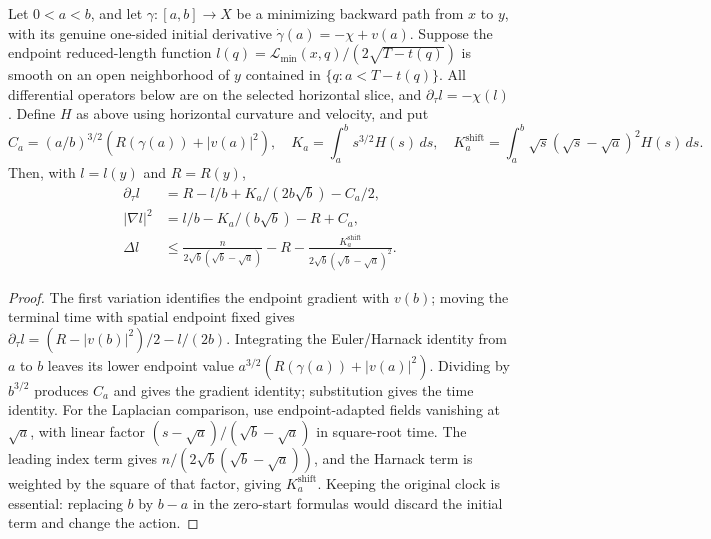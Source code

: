\begin{proposition}
\label{prop:positive-start}
Let $0<a<b$, and let $\gamma:[a,b]\to X$ be a minimizing backward
path from $x$ to $y$, with its genuine one-sided initial derivative
$\dot\gamma(a)=-\chi+v(a)$.  Suppose the endpoint reduced-length function
$l(q)=\mathcal L_{\min}(x,q)/(2\sqrt{T-t(q)})$ is smooth on an open
neighborhood of $y$ contained in $\{q:a<T-t(q)\}$.  All differential
operators below are on the selected horizontal slice, and
$\partial_\tau l=-\chi(l)$.  Define $H$ as above using horizontal
curvature and velocity, and put
\[
 C_a=(a/b)^{3/2}(R(\gamma(a))+|v(a)|^2),\quad
 K_a=\int_a^b s^{3/2}H(s)\,ds,\quad
 K_a^{\mathrm{shift}}=\int_a^b\sqrt s(\sqrt s-\sqrt a)^2H(s)\,ds.
\]
Then, with $l=l(y)$ and $R=R(y)$,
\begin{align*}
 \partial_\tau l&=R-l/b+K_a/(2b\sqrt b)-C_a/2,\\
 |\nabla l|^2&=l/b-K_a/(b\sqrt b)-R+C_a,\\
 \Delta l&\leq\frac{n}{2\sqrt b(\sqrt b-\sqrt a)}-R
       -\frac{K_a^{\mathrm{shift}}}
                    {2\sqrt b(\sqrt b-\sqrt a)^2}.
\end{align*}
\cite[Proposition 6.43, pp. 127--129; Lemma 6.49 and Theorem 6.50, p. 131]{MT2007}
\end{proposition}
\begin{proof}
The first variation identifies the endpoint gradient with $v(b)$; moving
the terminal time with spatial endpoint fixed gives
$\partial_\tau l=(R-|v(b)|^2)/2-l/(2b)$.
Integrating the Euler/Harnack identity from $a$ to $b$ leaves its lower
endpoint value $a^{3/2}(R(\gamma(a))+|v(a)|^2)$.
Dividing by $b^{3/2}$ produces $C_a$ and gives the gradient identity;
substitution gives the time identity.  For the Laplacian comparison, use
endpoint-adapted fields vanishing at $\sqrt a$, with linear factor
$(s-\sqrt a)/(\sqrt b-\sqrt a)$ in square-root time.  The leading
index term gives $n/(2\sqrt b(\sqrt b-\sqrt a))$, and the Harnack term
is weighted by the square of that factor, giving $K_a^{\mathrm{shift}}$.
Keeping the original clock is essential: replacing $b$ by $b-a$ in the
zero-start formulas would discard the initial term and change the action.
\end{proof}

